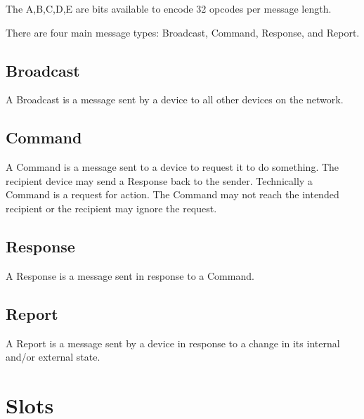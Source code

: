 The A,B,C,D,E are bits available to encode 32 opcodes per message length.

There are four main message types: Broadcast, Command, Response, and Report.

\subsection{Broadcast}
A Broadcast is a message sent by a device to all other devices on the network. 

\subsection{Command}
A Command is a message sent to a device to request it to do something. The recipient device may send a Response back to the sender. Technically a Command is a request for action. The Command may not reach the intended recipient or the recipient may ignore the request. 

\subsection{Response}
A Response is a message sent in response to a Command. 

\subsection{Report}
A Report is a message sent by a device in response to a change in its internal and/or external state.

\section{Slots}

